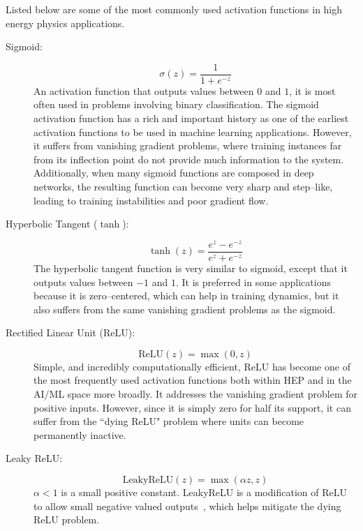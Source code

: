             Listed below are some of the most commonly used activation functions in high energy physics applications.
            \begin{description}
                \item[Sigmoid:]
                    \[\sigma(z) = \frac{1}{1 + e^{-z}}\]
                    An activation function that outputs values between \(0\) and \(1\), it is most often used in problems involving binary classification.
                    The sigmoid activation function has a rich and important history as one of the earliest activation functions to be used in machine learning applications.
                    However, it suffers from vanishing gradient problems, where training instances far from its inflection point do not provide much information to the system.
                    Additionally, when many sigmoid functions are composed in deep networks, the resulting function can become very sharp and step--like, leading to training instabilities and poor gradient flow.

                \item[Hyperbolic Tangent (\(\tanh\)):] \[\tanh(z) = \frac{e^z - e^{-z}}{e^z + e^{-z}}\]
                    The hyperbolic tangent function is very similar to sigmoid, except that it outputs values between \(-1\) and \(1\).
                    It is preferred in some applications because it is zero--centered, which can help in training dynamics, but it also suffers from the same vanishing gradient problems as the sigmoid.
                \item[Rectified Linear Unit (ReLU):] \[\text{ReLU}(z) = \max(0, z)\]
                    Simple, and incredibly computationally efficient, ReLU has become one of the most frequently used activation functions both within HEP and in the AI/ML space more broadly.
                    It addresses the vanishing gradient problem for positive inputs.
                    However, since it is simply zero for half its support, it can suffer from the ``dying ReLU" problem where units can become permanently inactive.
                \item[Leaky ReLU:] \[\label{eq:leaky-relu}\text{LeakyReLU}(z) = \max(\alpha z, z)\]
                    \(\alpha < 1\) is a small positive constant.
                    LeakyReLU is a modification of ReLU to allow small negative valued outputs~\cite{Maas2013RectifierModels}, which helps mitigate the dying ReLU problem.
                    

\end{description}
